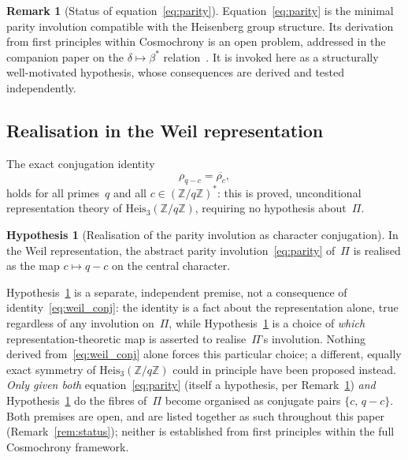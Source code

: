 \documentclass[11pt,a4paper]{article}
\theoremstyle{definition}
\newtheorem{remark}[theorem]{Remark}
\newtheorem{hypothesis}[theorem]{Hypothesis}
\newcommand{\bstar}{\beta^*}
\newcommand{\Heis}{\mathrm{Heis}_3}
\newcommand{\ZqZ}{\mathbb{Z}/q\mathbb{Z}}
\newcommand{\Fq}{(\mathbb{Z}/q\mathbb{Z})^*}
\begin{document}
    \begin{remark}[Status of equation~\eqref{eq:parity}]
      \label{rem:parity-status}
Equation~\eqref{eq:parity} is the minimal parity involution compatible
with the Heisenberg group structure.
Its derivation from first principles within Cosmochrony is an open
problem, addressed in the companion paper on the $\delta \mapsto \bstar$
relation~\cite{Beau2026a18}.
It is invoked here as a structurally well-motivated hypothesis,
whose consequences are derived and tested independently.
    \end{remark}

  \subsection{Realisation in the Weil representation}

    The exact conjugation identity
    \begin{equation}
      \rho_{q-c} = \overline{\rho_c},
      \label{eq:weil_conj}
    \end{equation}
    holds for all primes~$q$ and all $c \in \Fq$: this is proved,
    unconditional representation theory of $\Heis(\ZqZ)$, requiring no
    hypothesis about~$\Pi$.

    \begin{hypothesis}[Realisation of the parity involution as character conjugation]
      \label{hyp:realisation}
      In the Weil representation, the abstract parity
      involution~\eqref{eq:parity} of~$\Pi$ is realised as the map
      $c \mapsto q-c$ on the central character.
    \end{hypothesis}

    \noindent
    Hypothesis~\ref{hyp:realisation} is a separate, independent premise,
    not a consequence of identity~\eqref{eq:weil_conj}: the identity is a
    fact about the representation alone, true regardless of any
    involution on~$\Pi$, while Hypothesis~\ref{hyp:realisation} is a
    choice of \emph{which} representation-theoretic map is asserted to
    realise~$\Pi$'s involution.
    Nothing derived from~\eqref{eq:weil_conj} alone forces this
    particular choice; a different, equally exact symmetry of $\Heis(\ZqZ)$
    could in principle have been proposed instead.
    \emph{Only given both} equation~\eqref{eq:parity} (itself a
    hypothesis, per Remark~\ref{rem:parity-status}) \emph{and}
    Hypothesis~\ref{hyp:realisation} do the fibres of~$\Pi$ become
    organised as conjugate pairs $\{c,\,q-c\}$.
    Both premises are open, and are listed together as such throughout
    this paper (Remark~\ref{rem:status}); neither is established from
    first principles within the full Cosmochrony framework.
\end{document}
